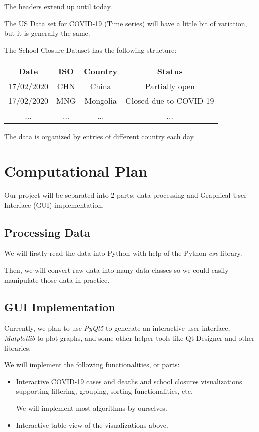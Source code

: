 \documentclass[fontsize=11pt]{article}
\begin{document}
The headers extend up until today.

The US Data set for COVID-19 (Time series) will have a little bit of variation, but it is generally the same.

The School Closure Dataset has the following structure:
\begin{center}
    \begin{tabular}{ |c|c|c|c| }
        \hline
        Date & ISO & Country & Status \\
        \hline
        17/02/2020 & CHN & China & Partially open \\
        \hline
        17/02/2020 & MNG & Mongolia & Closed due to COVID-19 \\
        \hline
        ... & ... & ... & ...\\
        \hline
    \end{tabular}
\end{center}

The data is organized by entries of different country each day.

\newpage


\section*{Computational Plan}

Our project will be separated into 2 parts: data processing and Graphical User Interface (GUI) implementation.

\subsection*{Processing Data}

We will firstly read the data into Python with help of the Python \emph{csv} library.

Then, we will convert raw data into many data classes so we could easily manipulate those data in practice.

\subsection*{GUI Implementation}

Currently, we plan to use \emph{PyQt5} to generate an interactive user interface, \emph{Matplotlib} to plot graphs, and some other helper tools like Qt Designer and other libraries.

We will implement the following functionalities, or parts:

\begin{itemize}
    \item
        Interactive COVID-19 cases and deaths and school closures visualizations supporting filtering, grouping, sorting functionalities, etc.

        We will implement most algorithms by ourselves.
    \item
        Interactive table view of the visualizations above.
\end{itemize}
\end{document}

